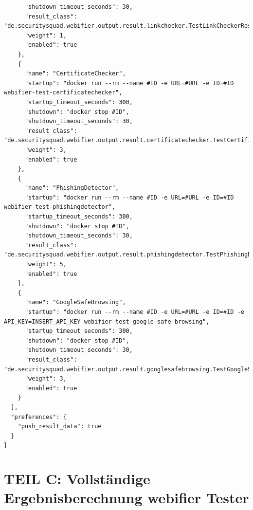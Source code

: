 \begin{scriptsize}
\begin{lstlisting}
      "shutdown_timeout_seconds": 30,
      "result_class": "de.securitysquad.webifier.output.result.linkchecker.TestLinkCheckerResultInfo",
      "weight": 1,
      "enabled": true
    },
    {
      "name": "CertificateChecker",
      "startup": "docker run --rm --name #ID -e URL=#URL -e ID=#ID webifier-test-certificatechecker",
      "startup_timeout_seconds": 300,
      "shutdown": "docker stop #ID",
      "shutdown_timeout_seconds": 30,
      "result_class": "de.securitysquad.webifier.output.result.certificatechecker.TestCertificateCheckerResultInfo",
      "weight": 3,
      "enabled": true
    },
    {
      "name": "PhishingDetector",
      "startup": "docker run --rm --name #ID -e URL=#URL -e ID=#ID webifier-test-phishingdetector",
      "startup_timeout_seconds": 300,
      "shutdown": "docker stop #ID",
      "shutdown_timeout_seconds": 30,
      "result_class": "de.securitysquad.webifier.output.result.phishingdetector.TestPhishingDetectorResultInfo",
      "weight": 5,
      "enabled": true
    },
    {
      "name": "GoogleSafeBrowsing",
      "startup": "docker run --rm --name #ID -e URL=#URL -e ID=#ID -e API_KEY=INSERT_API_KEY webifier-test-google-safe-browsing",
      "startup_timeout_seconds": 300,
      "shutdown": "docker stop #ID",
      "shutdown_timeout_seconds": 30,
      "result_class": "de.securitysquad.webifier.output.result.googlesafebrowsing.TestGoogleSafeBrowsingResultInfo",
      "weight": 3,
      "enabled": true
    }
  ],
  "preferences": {
    "push_result_data": true
  }
}
\end{lstlisting}
\end{scriptsize}

\newpage

\section*{TEIL C: Vollständige Ergebnisberechnung webifier Tester}
\label{app:c}

